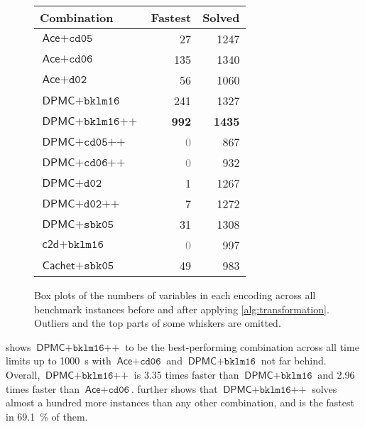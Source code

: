 \documentclass[runningheads]{llncs}
\begin{document}
\begin{figure}
  \centering
  \begin{minipage}{0.49\textwidth}
    \centering
    \caption{Box plots of the numbers of variables in each encoding across all
      benchmark instances before and after applying \cref{alg:transformation}.
      Outliers and the top parts of some whiskers are
      omitted.}\label{fig:box}
  \end{minipage}\hfill
  \begin{minipage}{0.49\textwidth}
    \centering
    \label{tbl:performance}
    \begin{tabular}{lrr}
      \toprule
      Combination & Fastest & Solved \\
      \midrule
      $\textsf{Ace} + \texttt{cd05}$ & 27 & 1247 \\
      $\textsf{Ace} + \texttt{cd06}$ & 135 & 1340 \\
      $\textsf{Ace} + \texttt{d02}$ & 56 & 1060 \\
      $\textsf{DPMC} + \texttt{bklm16}$ & 241 & 1327 \\
      $\textsf{DPMC} + \texttt{bklm16++}$ & \textbf{992} & \textbf{1435} \\
      $\textsf{DPMC} + \texttt{cd05++}$ & \textcolor{gray}{0} & 867 \\
      $\textsf{DPMC} + \texttt{cd06++}$ & \textcolor{gray}{0} & 932 \\
      $\textsf{DPMC} + \texttt{d02}$ & 1 & 1267 \\
      $\textsf{DPMC} + \texttt{d02++}$ & 7 & 1272 \\
      $\textsf{DPMC} + \texttt{sbk05}$ & 31 & 1308 \\
      $\textsf{c2d} + \texttt{bklm16}$ & \textcolor{gray}{0} & 997 \\
      $\textsf{Cachet} + \texttt{sbk05}$ & 49 & 983 \\
      \bottomrule
    \end{tabular}
  \end{minipage}
\end{figure}

 shows $\textsf{DPMC}+\texttt{bklm16++}$ to be the
best-performing combination across all time limits up to \SI{1000}{\second} with
$\textsf{Ace} + \texttt{cd06}$ and $\textsf{DPMC}+\texttt{bklm16}$ not far
behind. Overall, $\textsf{DPMC}+\texttt{bklm16++}$ is 3.35 times faster than
$\textsf{DPMC}+\texttt{bklm16}$ and 2.96 times faster than
$\textsf{Ace}+\texttt{cd06}$.  further shows that
$\textsf{DPMC}+\texttt{bklm16++}$ solves almost a hundred more instances than
any other combination, and is the fastest in \SI{69.1}{\percent} of them.
\end{document}
